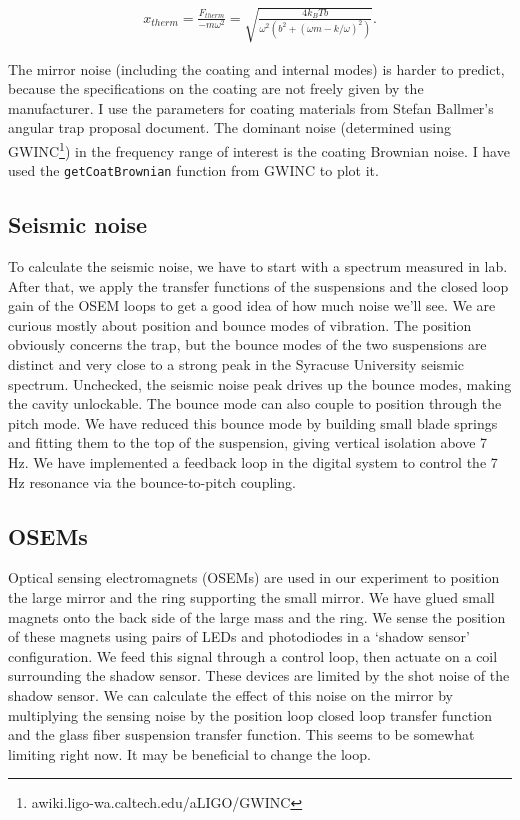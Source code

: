\begin{eqnarray}
x_{therm} = \frac{F_{therm}}{-m\omega^2} = \sqrt{\frac{4 k_B T b}{\omega^2(b^2+(\omega m -k/\omega)^2)}}.
\label{eq:thermalposnoise}
\end{eqnarray}

The mirror noise (including the coating and internal modes) is harder to predict, because the specifications on the coating are not freely given by the manufacturer.  I use the parameters for coating materials from Stefan Ballmer's angular trap proposal document.  The dominant noise (determined using GWINC\footnote{awiki.ligo-wa.caltech.edu/aLIGO/GWINC}) in the frequency range of interest is the coating Brownian noise.  I have used the \texttt{getCoatBrownian} function from GWINC to plot it.


\subsection{Seismic noise}

To calculate the seismic noise, we have to start with a spectrum measured in lab.  After that, we apply the transfer functions of the suspensions and the closed loop gain of the OSEM loops to get a good idea of how much noise we'll see.  We are curious mostly about position and bounce modes of vibration.  The position obviously concerns the trap, but the bounce modes of the two suspensions are distinct and very close to a strong peak in the Syracuse University seismic spectrum.  Unchecked, the seismic noise peak drives up the bounce modes, making the cavity unlockable.  The bounce mode can also couple to position through the pitch mode.  We have reduced this bounce mode by building small blade springs and fitting them to the top of the suspension, giving vertical isolation above 7 Hz.  We have implemented a feedback loop in the digital system to control the 7 Hz resonance via the bounce-to-pitch coupling.

\subsection{OSEMs}

Optical sensing electromagnets (OSEMs) are used in our experiment to position the large mirror and the ring supporting the small mirror.  We have glued small magnets onto the back side of the large mass and the ring. We sense the position of these magnets using pairs of LEDs and photodiodes in a `shadow sensor' configuration.  We feed this signal through a control loop, then actuate on a coil surrounding the shadow sensor.  These devices are limited by the shot noise of the shadow sensor.  We can calculate the effect of this noise on the mirror by multiplying the sensing noise by the position loop closed loop transfer function and the glass fiber suspension transfer function.  This seems to be somewhat limiting right now.  It may be beneficial to change the loop.


